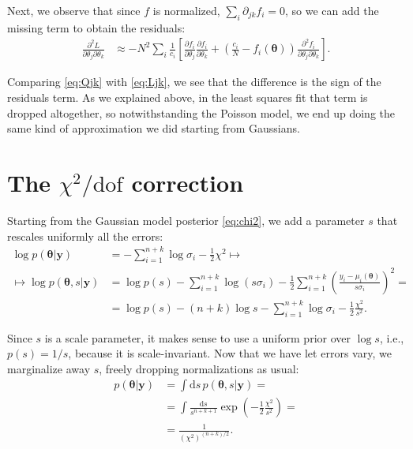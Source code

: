 Next, we observe that since $f$ is normalized, $\sum_i \partial_{jk} f_i = 0$,
so we can add the missing term to obtain the residuals:
%
\begin{align}
    \frac {\partial^2 L} {\partial\theta_j \partial\theta_k} &\approx
    -N^2 \sum_i \frac 1 {c_i} \left[
    \frac {\partial f_i} {\partial \theta_j}
    \frac {\partial f_i} {\partial \theta_k}
    + \left( \frac {c_i} N - f_i(\boldsymbol\theta) \right)
    \frac {\partial^2 f_i} {\partial\theta_j \partial\theta_k}
    \right]. \label{eq:Ljk}
\end{align}

Comparing \eqref{eq:Qjk} with \eqref{eq:Ljk}, we see that the difference is the
sign of the residuals term. As we explained above, in the least squares fit
that term is dropped altogether, so notwithstanding the Poisson model, we end
up doing the same kind of approximation we did starting from Gaussians.

\section{The $\chi^2/\mathrm{dof}$ correction}

Starting from the Gaussian model posterior \eqref{eq:chi2}, we add a parameter
$s$ that rescales uniformly all the errors:
%
\begin{align}
    \log p(\boldsymbol\theta|\mathbf y)
    &= -\sum_{i=1}^{n+k} \log\sigma_i - \frac12 \chi^2 \mapsto \\
    \mapsto \log p(\boldsymbol\theta,s|\mathbf y)
    &= \log p(s) -\sum_{i=1}^{n+k} \log(s \sigma_i)
    - \frac 12 \sum_{i=1}^{n+k}
    \left( \frac {y_i - \mu_i(\boldsymbol\theta)} {s \sigma_i} \right)^2 = \\
    &= \log p(s) - (n+k) \log s - \sum_{i=1}^{n+k} \log\sigma_i
    - \frac 12 \frac{\chi^2}{s^2}.
\end{align}

Since $s$ is a scale parameter, it makes sense to use a uniform prior over
$\log s$, i.e., $p(s) = 1/s$, because it is scale-invariant. Now that we have
let errors vary, we marginalize away $s$, freely dropping normalizations as
usual:
%
\begin{align}
    p(\boldsymbol\theta|\mathbf y)
    &= \int \mathrm ds\,
    p(\boldsymbol\theta,s|\mathbf y) = \\
    &= \int \frac {\mathrm ds} {s^{n+k+1}}
    \exp\left(-\frac12 \frac {\chi^2} {s^2}\right) = \\
    &= \frac 1 {(\chi^2)^{(n+k)/2}}.
\end{align}

